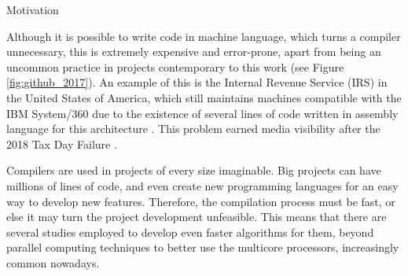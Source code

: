 \begin{section}{Motivation}

Although it is possible to write code in machine language, which turns a compiler
unnecessary, this is extremely expensive and error-prone, apart from being an
uncommon practice in projects contemporary to this work \citep{githuboctoverse}
(see Figure \ref{fig:github_2017}). An example of this is the Internal Revenue
Service (IRS) in the United States of America, which still maintains machines
compatible with the IBM System/360 due to the existence of several lines of
code written in assembly language for this architecture \citep{gao}.  This
problem earned media visibility after the  2018 Tax Day Failure
\citep{tax_failure}.


Compilers are used in projects of every size imaginable. Big projects can have
millions of lines of code, and even create new programming languages for an
easy way to develop new features. Therefore, the compilation process must be
fast, or else it may turn the project development unfeasible.  This means that
there are several studies employed to develop even faster algorithms for them,
beyond parallel computing techniques to better use the multicore processors,
increasingly common nowadays.


\end{section}

